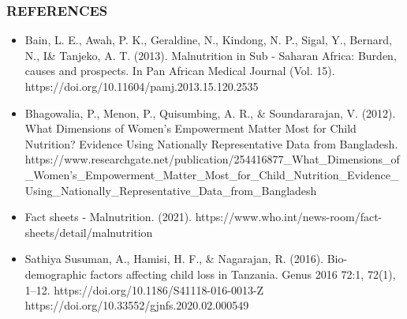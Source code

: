 \begin{frame}
	\frametitle{REFERENCES}
	\begin{itemize}
		\item Bain, L. E., Awah, P. K., Geraldine, N., Kindong, N. P., Sigal, Y., Bernard, N., I\& Tanjeko, A. T. (2013). Malnutrition in Sub - Saharan Africa: Burden, causes and prospects. In Pan African Medical Journal (Vol. 15). https://doi.org/10.11604/pamj.2013.15.120.2535	
		\item Bhagowalia, P., Menon, P., Quisumbing, A. R., \& Soundararajan, V. (2012). What Dimensions of Women’s Empowerment Matter Most for Child Nutrition? Evidence Using Nationally Representative Data from Bangladesh. 
		https://www.researchgate.net/publication/254416877\_What\_Dimensions\_of\_Women’s\_Empowerment\_Matter\_Most\_for\_Child\_Nutrition\_Evidence\_Using\_Nationally\_Representative\_Data\_from\_Bangladesh
		\item Fact sheets - Malnutrition. (2021).  https://www.who.int/news-room/fact-sheets/detail/malnutrition
		\item Sathiya Susuman, A., Hamisi, H. F., \& Nagarajan, R. (2016). Bio-demographic factors affecting child loss in Tanzania. Genus 2016 72:1, 72(1), 1–12. https://doi.org/10.1186/S41118-016-0013-Z
		https://doi.org/10.33552/gjnfs.2020.02.000549
	\end{itemize}
\end{frame}
